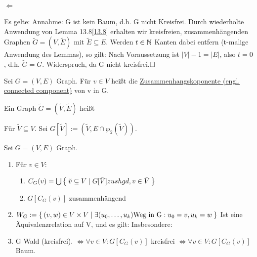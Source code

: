 \documentclass{../../meta/tudscript}
\begin{document}
\setcounter{section}{13}
\setcounter{subsection}{9}
\paragraph{$\Leftarrow$}
Es gelte:
Annahme: G ist kein Baum, d.h. G nicht Kreisfrei. Durch wiederholte Anwendung
von Lemma 13.8\ref{13.8} erhalten wir kreisfreien, zusammenhängenden Graphen 
$\tilde{G} = (V, \tilde{E})$ mit $\tilde{E} \subseteq E$. Werden $t \in \mathbb{N}$ Kanten
dabei entfern (t-malige Anwendung des Lemmas), so gilt:
Nach Voraussetzung ist $|V| - 1 = |E|$, also $t = 0$, d.h. $\tilde{G} = G$.
Widerspruch, da G nicht kreisfrei.$\hfill\square$

Sei $G = (V, E)$ Graph. Für $v \in V$ heißt 
die \underline{Zusammenhangskoponente (engl. connected component)} von v in G.

Ein Graph $\tilde{G} = (\tilde{V}, \tilde{E})$ heißt 

Für $\tilde{V} \subseteq V$. Sei $G [\tilde{V}] := (\tilde{V}, E \cap \wp_2 (\tilde{V}))$.

Sei $G = (V, E)$ Graph.
\begin{enumerate}
    \item Für $v \in V$: 
    \begin{enumerate}
        \item $C_G (v) = \bigcup \Set{\tilde{v} \subseteq V \mid G [\tilde{V}] zushgd, v \in \tilde{V}}$ 
        \item $G [C_G (v)]$ zusammenhängend    
    \end{enumerate}
    \item $W_G := \Set{(v,w) \in V \times V \mid \exists (u_0, \ldots, u_k) \text{Weg in G}: u_0 = v, u_k = w}$
    Ist eine Äquivalenzrelation auf V, und es gilt:
    Insbesondere:
    \item G Wald (kreisfrei). $\iff \forall v \in V: G [C_G (v)]$ kreisfrei $\iff \forall v \in V: G[C_G (v)]$ Baum. 
\end{enumerate}
\end{document}
